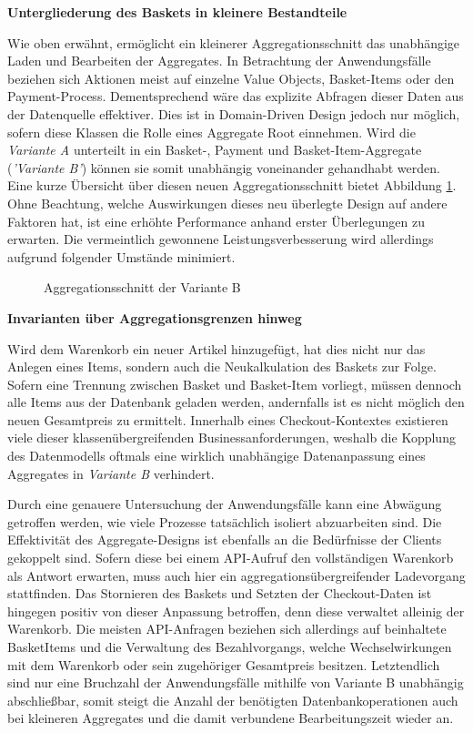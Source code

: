 \textbf{Untergliederung des Baskets in kleinere Bestandteile}

Wie oben erwähnt, ermöglicht ein kleinerer Aggregationsschnitt das unabhängige Laden und Bearbeiten der Aggregates. In Betrachtung der Anwendungsfälle beziehen sich Aktionen meist auf einzelne Value Objects, Basket-Items oder den Payment-Process. Dementsprechend wäre das explizite Abfragen dieser Daten aus der Datenquelle effektiver. Dies ist in Domain-Driven Design jedoch nur möglich, sofern diese Klassen die Rolle eines Aggregate Root einnehmen. Wird die \emph{Variante A} unterteilt in ein Basket-, Payment und Basket-Item-Aggregate (\emph{'Variante B'}) können sie somit unabhängig voneinander gehandhabt werden. Eine kurze Übersicht über diesen neuen Aggregationsschnitt bietet Abbildung \ref{fig:VarB}. Ohne Beachtung, welche Auswirkungen dieses neu überlegte Design auf andere Faktoren hat, ist eine erhöhte Performance anhand erster Überlegungen zu erwarten. Die vermeintlich gewonnene Leistungsverbesserung wird allerdings aufgrund folgender Umstände minimiert.

\begin{figure}[htbp]
	\centering
	
	\caption{Aggregationsschnitt der Variante B}
	\label{fig:VarB}
\end{figure}

\vspace{1em}

\textbf{Invarianten über Aggregationsgrenzen hinweg}

Wird dem Warenkorb ein neuer Artikel hinzugefügt, hat dies nicht nur das Anlegen eines Items, sondern auch die Neukalkulation des Baskets zur Folge. Sofern eine Trennung zwischen Basket und Basket-Item vorliegt, müssen dennoch alle Items aus der Datenbank geladen werden, andernfalls ist es nicht möglich den neuen Gesamtpreis zu ermittelt. Innerhalb eines Checkout-Kontextes existieren viele dieser klassenübergreifenden Businessanforderungen, weshalb die Kopplung des Datenmodells oftmals eine wirklich unabhängige Datenanpassung eines Aggregates in \emph{Variante B} verhindert.

Durch eine genauere Untersuchung der Anwendungsfälle kann eine Abwägung getroffen werden, wie viele Prozesse tatsächlich isoliert abzuarbeiten sind. Die Effektivität des Aggregate-Designs ist ebenfalls an die Bedürfnisse der Clients gekoppelt sind. Sofern diese bei einem API-Aufruf den vollständigen Warenkorb als Antwort erwarten, muss auch hier ein aggregationsübergreifender Ladevorgang stattfinden. Das Stornieren des Baskets und Setzten der Checkout-Daten ist hingegen positiv von dieser Anpassung betroffen, denn diese verwaltet alleinig der Warenkorb. Die meisten API-Anfragen beziehen sich allerdings auf beinhaltete BasketItems und die Verwaltung des Bezahlvorgangs, welche Wechselwirkungen mit dem Warenkorb oder sein zugehöriger Gesamtpreis besitzen. Letztendlich sind nur eine Bruchzahl der Anwendungsfälle mithilfe von Variante B unabhängig abschließbar, somit steigt die Anzahl der benötigten Datenbankoperationen auch bei kleineren Aggregates und die damit verbundene Bearbeitungszeit wieder an.

